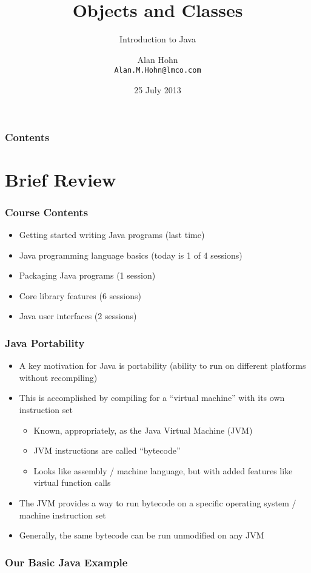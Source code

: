 \documentclass{beamer}
\title[]{Objects and Classes}
\subtitle{Introduction to Java}
\author{Alan Hohn\\
\texttt{Alan.M.Hohn@lmco.com}}
\date{25 July 2013}
\begin{document}
\begin{frame}
   \titlepage
\end{frame}

\begin{frame}
   \frametitle{Contents}
   \tableofcontents[]
\end{frame}

\section{Brief Review}
\begin{frame}
\frametitle{Course Contents}
\begin{itemize}
\item Getting started writing Java programs (last time)
\item Java programming language basics (today is 1 of 4 sessions)
\item Packaging Java programs (1 session)
\item Core library features (6 sessions)
\item Java user interfaces (2 sessions)
\end{itemize}
\end{frame}

\begin{frame}
\frametitle{Java Portability}
\begin{itemize}
\item A key motivation for Java is portability (ability to run on different platforms without recompiling)
\item This is accomplished by compiling for a ``virtual machine'' with its own instruction set
\begin{itemize}
\item Known, appropriately, as the Java Virtual Machine (JVM)
\item JVM instructions are called ``bytecode''
\item Looks like assembly / machine language, but with added features like virtual function calls
\end{itemize}
\item The JVM provides a way to run bytecode on a specific operating system / machine instruction set
\item Generally, the same bytecode can be run unmodified on any JVM
\end{itemize}
\end{frame}

\begin{frame}[fragile]
\frametitle{Our Basic Java Example}

\end{frame}
\end{document}
